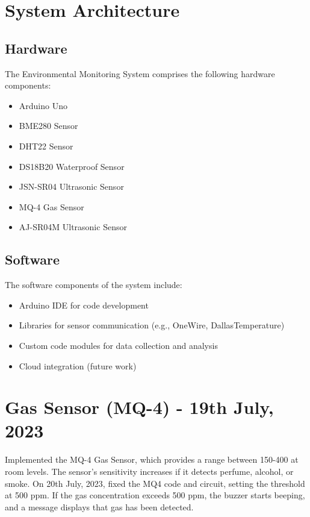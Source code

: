 \documentclass{article}
\begin{document}
\section{System Architecture}

\subsection{Hardware}

The Environmental Monitoring System comprises the following hardware components:

\begin{itemize}
    \item Arduino Uno
    \item BME280 Sensor
    \item DHT22 Sensor
    \item DS18B20 Waterproof Sensor
    \item JSN-SR04 Ultrasonic Sensor
    \item MQ-4 Gas Sensor
    \item AJ-SR04M Ultrasonic Sensor
\end{itemize}

\subsection{Software}

The software components of the system include:

\begin{itemize}
    \item Arduino IDE for code development
    \item Libraries for sensor communication (e.g., OneWire, DallasTemperature)
    \item Custom code modules for data collection and analysis
    \item Cloud integration (future work)

\end{itemize}



\section*{Gas Sensor (MQ-4) - 19th July, 2023}
Implemented the MQ-4 Gas Sensor, which provides a range between 150-400 at room levels. The sensor's sensitivity increases if it detects perfume, alcohol, or smoke. On 20th July, 2023, fixed the MQ4 code and circuit, setting the threshold at 500 ppm. If the gas concentration exceeds 500 ppm, the buzzer starts beeping, and a message displays that gas has been detected.
\end{document}
